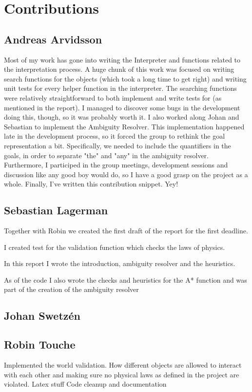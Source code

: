 \section*{Contributions}
\subsection*{Andreas Arvidsson}
Most of my work has gone into writing the Interpreter and functions related to the interpretation process.
A huge chunk of this work was focused on writing search functions for the objects (which took a long time to get right) and writing unit tests for every helper function in the interpreter.
The searching functions were relatively straightforward to both implement and write tests for (as mentioned in the report).
I managed to discover some bugs in the development doing this, though, so it was probably worth it.
\newline
\newline
I also worked along Johan and Sebastian to implement the Ambiguity Resolver. This implementation happened late in the development process, so it forced the group to rethink the goal representation a bit. Specifically, we needed to include the quantifiers in the goals, in order to separate "the" and "any" in the ambiguity resolver.
\newline
\newline
Furthermore, I participed in the group meetings, development sessions and discussion like any good boy would do, so I have a good grasp on the project as a whole.
\newline
\newline
Finally, I've written this contribution snippet. Yey!

\subsection*{Sebastian Lagerman}
Together with Robin we created the first draft of the report for the first deadline.

I created test for the validation function which checks the laws of physics.

In this report I wrote the introduction, ambiguity resolver and the heuristics.

As of the code I also wrote the checks and heuristics for the A* function and was part of the creation of the ambiguity resolver

\subsection*{Johan Swetz\'en}
\subsection*{Robin Touche}
Implemented the world validation.
How different objects are allowed to interact with each other and making sure no physical laws as defined in the project are violated.
Latex stuff
Code cleanup and documentation
